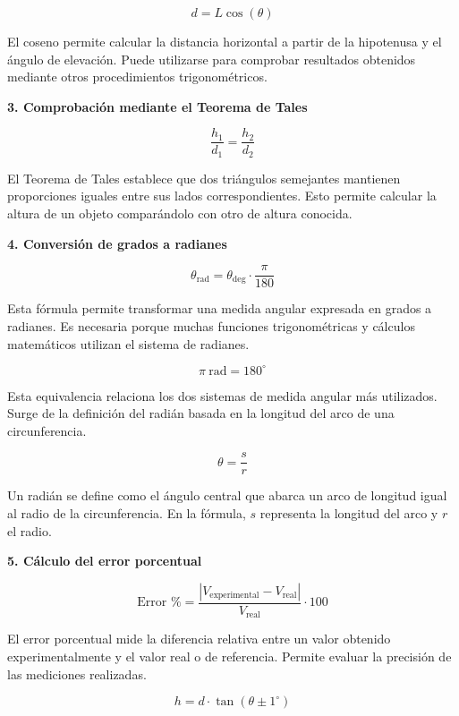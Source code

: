 \documentclass[a4paper,12pt]{extarticle}
\begin{document}
    \[
    d=L\cos(\theta)
    \]

    El coseno permite calcular la distancia horizontal a partir de la hipotenusa y el ángulo de elevación. Puede utilizarse para comprobar resultados obtenidos mediante otros procedimientos trigonométricos.

    \vspace{0.3cm}

    \textbf{3. Comprobación mediante el Teorema de Tales}

    \[
    \frac{h_1}{d_1}=\frac{h_2}{d_2}
    \]

    El Teorema de Tales establece que dos triángulos semejantes mantienen proporciones iguales entre sus lados correspondientes. Esto permite calcular la altura de un objeto comparándolo con otro de altura conocida.

    \vspace{0.3cm}

    \textbf{4. Conversión de grados a radianes}

    \[
    \theta_{\text{rad}}=\theta_{\text{deg}}\cdot\frac{\pi}{180}
    \]

    Esta fórmula permite transformar una medida angular expresada en grados a radianes. Es necesaria porque muchas funciones trigonométricas y cálculos matemáticos utilizan el sistema de radianes.

    \[
    \pi \ \text{rad}=180^\circ
    \]

    Esta equivalencia relaciona los dos sistemas de medida angular más utilizados. Surge de la definición del radián basada en la longitud del arco de una circunferencia.

    \[
    \theta=\frac{s}{r}
    \]

    Un radián se define como el ángulo central que abarca un arco de longitud igual al radio de la circunferencia. En la fórmula, \(s\) representa la longitud del arco y \(r\) el radio.

    \vspace{0.3cm}

    \textbf{5. Cálculo del error porcentual}

    \[
    \text{Error \%}=\frac{|V_{\text{experimental}}-V_{\text{real}}|}{V_{\text{real}}}\cdot100
    \]

    El error porcentual mide la diferencia relativa entre un valor obtenido experimentalmente y el valor real o de referencia. Permite evaluar la precisión de las mediciones realizadas.

    \[
    h=d\cdot\tan(\theta\pm1^\circ)
    \]
\end{document}
